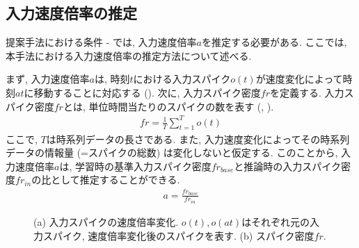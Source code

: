 \subsection{入力速度倍率の推定}
提案手法における条件 - では, 入力速度倍率$a$を推定する必要がある.
ここでは, 本手法における入力速度倍率の推定方法について述べる.

まず, 入力速度倍率$a$は, 時刻$t$における入力スパイク$o(t)$が速度変化によって時刻$at$に移動することに対応する ().
次に, 入力スパイク密度$fr$を定義する.
入力スパイク密度$fr$とは, 単位時間当たりのスパイクの数を表す (, ).
\begin{align}
    fr = \frac{1}{T} \sum_{t=1}^{T} o(t) \label{eq:input:spike:density}
\end{align}
ここで, $T$は時系列データの長さである.
また, 入力速度変化によってその時系列データの情報量 (=スパイクの総数) は変化しないと仮定する.
このことから, 入力速度倍率$a$は, 学習時の基準入力スパイク密度$fr_{base}$と推論時の入力スパイク密度$fr_{in}$の比として推定することができる.
\begin{align}
    a = \frac{fr_{base}}{fr_{in}}
\end{align}

\begin{figure}[htb]
    \centering

    \begin{minipage}{0.9\textwidth}
        \centering
        
        \label{fig:inspike:scaled}
    \end{minipage}

    \begin{minipage}{0.5\textwidth}
        \centering
        
        \label{fig:firingrate}
    \end{minipage}

    \caption[入力スパイクの速度倍率変化とスパイク密度]{
        (a) 入力スパイクの速度倍率変化.
        $o(t), o(at)$はそれぞれ元の入力スパイク, 速度倍率変化後のスパイクを表す. 
        (b) スパイク密度$fr$.
    }
\end{figure}